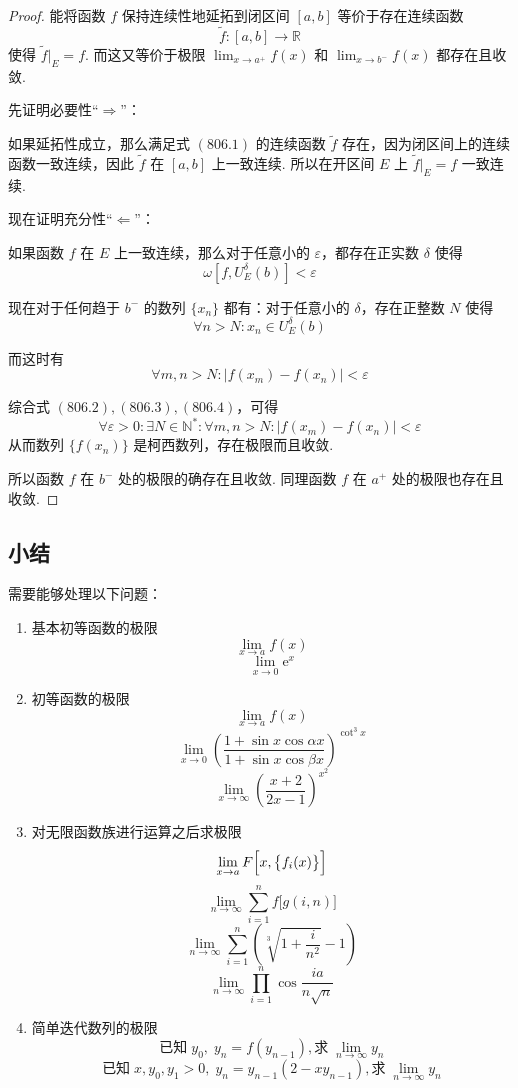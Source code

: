 \begin{proof}
    能将函数 $f$ 保持连续性地延拓到闭区间 $[a,b]$ 等价于存在连续函数
    \[\tilde{f}: [a,b] \rightarrow \mathbb{R} \tag{806.1}\]
    使得 $\tilde{f}|_E = f$. 而这又等价于极限 $\displaystyle \lim_{x \rightarrow a^+} f(x)$ 和 $\displaystyle \lim_{x \rightarrow b^-} f(x)$ 都存在且收敛.

    先证明必要性“$\Rightarrow$”：

    如果延拓性成立，那么满足式 $(806.1)$ 的连续函数 $\tilde{f}$ 存在，因为闭区间上的连续函数一致连续，因此 $\tilde{f}$ 在 $[a,b]$ 上一致连续. 所以在开区间 $E$ 上 $\tilde{f}|_E = f$ 一致连续.

    现在证明充分性“$\Leftarrow$”：

    如果函数 $f$ 在 $E$ 上一致连续，那么对于任意小的 $\varepsilon$，都存在正实数 $\delta$ 使得
    \[\omega[f, U_E^\delta(b)] < \varepsilon \tag{806.2}\]

    现在对于任何趋于 $b^-$ 的数列 $\{x_n\}$ 都有：对于任意小的 $\delta$，存在正整数 $N$ 使得
    \[\forall n > N: x_n \in U_E^\delta(b) \tag{806.3}\]

    而这时有
    \[\forall m,n > N: \lvert f(x_m) - f(x_n)\rvert < \varepsilon \tag{806.4}\]

    综合式 $(806.2),(806.3),(806.4)$，可得
    \[\forall \varepsilon > 0: \exists N \in \mathbb{N}^*: \forall m,n > N: \lvert f(x_m) - f(x_n)\rvert < \varepsilon \tag{806.5}\]
    从而数列 $\{f(x_n)\}$ 是柯西数列，存在极限而且收敛.

    所以函数 $f$ 在 $b^-$ 处的极限的确存在且收敛. 同理函数 $f$ 在 $a^+$ 处的极限也存在且收敛.
\end{proof}

\subsection{小结}
需要能够处理以下问题：

\begin{enumerate}
    \item 基本初等函数的极限
    \[\lim_{x \rightarrow a} f(x)\]
    \[\lim_{x \rightarrow 0} \mathrm{e}^{x}\]
    \item 初等函数的极限
    \[\lim_{x \rightarrow a} f(x)\]
    \[\lim_{x \rightarrow 0} \left(\frac{1 + \sin x \cos \alpha x}{1 + \sin x \cos \beta x}\right)^{\cot^3 x}\]
    \[\lim_{x \rightarrow \infty} \left(\frac{x + 2}{2x - 1}\right)^{x^2}\]
    \item 对无限函数族进行运算之后求极限
    \[\lim_{x \rightarrow a} F\Bigl[x,\bigl\{f_i(x)\bigr\}\Bigr]\]
    \[\lim_{n \rightarrow \infty} \sum_{i=1}^{n} f\bigl[g(i,n)\bigr]\]
    \[\lim_{n \rightarrow \infty} \sum_{i=1}^{n} \left(\sqrt[3]{1 + \frac{i}{n^2}} - 1\right)\]
    \[\lim_{n \rightarrow \infty} \prod_{i=1}^{n} \cos \frac{ia}{n\sqrt{n}}\]
    \item 简单迭代数列的极限
    \[\text{已知} \;y_0,\; y_n = f(y_{n-1}), \text{求} \;\lim_{n \rightarrow \infty} y_n\]
    \[\text{已知} \;x, y_0, y_1 > 0,\; y_n = y_{n-1} (2 - xy_{n-1}), \text{求} \;\lim_{n \rightarrow \infty} y_n\]
\end{enumerate}